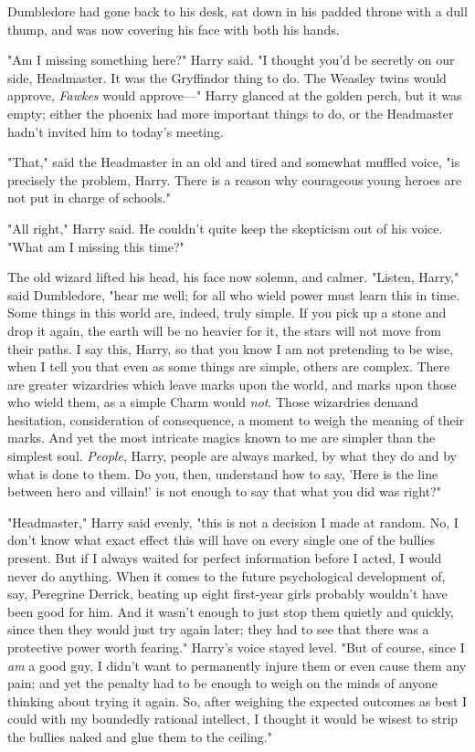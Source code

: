 Dumbledore had gone back to his desk, sat down in his padded throne with a dull 
thump, and was now covering his face with both his hands.

"Am I missing something here?" Harry said. "I thought you'd be secretly on our 
side, Headmaster. It was the Gryffindor thing to do. The Weasley twins would 
approve, \emph{Fawkes} would approve---" Harry glanced at the golden perch, but 
it was empty; either the phoenix had more important things to do, or the 
Headmaster hadn't invited him to today's meeting.

"That," said the Headmaster in an old and tired and somewhat muffled voice, "is 
precisely the problem, Harry. There is a reason why courageous young heroes are 
not put in charge of schools."

"All right," Harry said. He couldn't quite keep the skepticism out of his 
voice. "What am I missing this time?"

The old wizard lifted his head, his face now solemn, and calmer. "Listen, 
Harry," said Dumbledore, "hear me well; for all who wield power must learn this 
in time. Some things in this world are, indeed, truly simple. If you pick up a 
stone and drop it again, the earth will be no heavier for it, the stars will 
not move from their paths. I say this, Harry, so that you know I am not 
pretending to be wise, when I tell you that even as some things are simple, 
others are complex. There are greater wizardries which leave marks upon the 
world, and marks upon those who wield them, as a simple Charm would \emph{not}. 
Those wizardries demand hesitation, consideration of consequence, a moment to 
weigh the meaning of their marks. And yet the most intricate magics known to me 
are simpler than the simplest soul. \emph{People}, Harry, people are always 
marked, by what they do and by what is done to them. Do you, then, understand 
how to say, 'Here is the line between hero and villain!' is not enough to say 
that what you did was right?"

"Headmaster," Harry said evenly, "this is not a decision I made at random. No, 
I don't know what exact effect this will have on every single one of the 
bullies present. But if I always waited for perfect information before I acted, 
I would never do anything. When it comes to the future psychological 
development of, say, Peregrine Derrick, beating up eight first-year girls 
probably wouldn't have been good for him. And it wasn't enough to just stop 
them quietly and quickly, since then they would just try again later; they had 
to see that there was a protective power worth fearing." Harry's voice stayed 
level. "But of course, since I \emph{am} a good guy, I didn't want to 
permanently injure them or even cause them any pain; and yet the penalty had to 
be enough to weigh on the minds of anyone thinking about trying it again. So, 
after weighing the expected outcomes as best I could with my boundedly rational 
intellect, I thought it would be wisest to strip the bullies naked and glue 
them to the ceiling."

